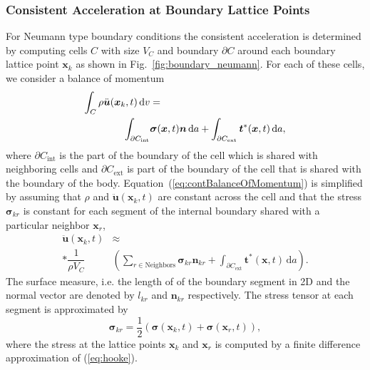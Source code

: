 \documentclass{article}
\renewcommand{\vec}{\boldsymbol}        %
\begin{document}
\subsubsection{Consistent Acceleration at Boundary Lattice Points}
For Neumann type boundary conditions the consistent acceleration is determined by computing cells $C$ with size $V_C$ and boundary $\partial{C}$ around each boundary lattice point $\vec{x}_k$ as shown in Fig.~\ref{fig:boundary_neumann}. For each of these cells, we consider a balance of momentum
\begin{align}
\int_{C}\rho \ddot{\vec{u}}(\vec{x}_k,t)\, {\rm d}v & = \nonumber\\
\int_{\partial{C}_{\text{int}}} & \vec{\sigma}(\vec{x},t)\vec{n}\, \text{d}a + \int_{\partial{C}_{\text{ext}}} \vec{t}^*(\vec{x},t)\, \text{d}a,
    \label{eq:contBalanceOfMomentum}
\end{align}
where $\partial{C}_{\text{int}}$ is the part of the boundary of the cell which is shared with neighboring cells and $\partial{C}_{\text{ext}}$ is part of the boundary of the cell that is shared with the boundary of the body.
Equation~(\ref{eq:contBalanceOfMomentum}) is 
simplified by assuming that $\rho$ and $\ddot{\vec{u}}(\vec{x}_k,t)$ are constant across the cell and that the stress $\vec{\sigma}_{kr}$ is constant for each segment of the internal boundary  shared with a particular neighbor $\vec{x}_r$,
\begin{align}
    \ddot{\vec{u}}(\vec{x}_k,t)& \approx \nonumber\\* \dfrac{1}{\rho{V_C}}&\left(\sum_{r\in\text{Neighbors}}\vec{\sigma}_{kr}\vec{n}_{kr} + \int_{\partial{C}_{\text{ext}}}\vec{t}^*(\vec{x},t)\,\text{d}a\right).
    \label{eq:acc_neumann}
\end{align}
The surface measure, i.e. the length of of the boundary segment in 2D and the normal vector are denoted by $l_{kr}$ and $\vec{n}_{kr}$ respectively. The stress tensor at each segment is approximated by 
\begin{equation}
    \vec{\sigma}_{kr} = \dfrac{1}{2}\left(\vec{\sigma}(\vec{x}_k,t)+\vec{\sigma}(\vec{x}_r,t)\right),
\end{equation}
where the stress at the lattice points $\vec{x}_k$ and $\vec{x}_r$ is computed by a finite difference approximation of (\ref{eq:hooke}).
\end{document}

